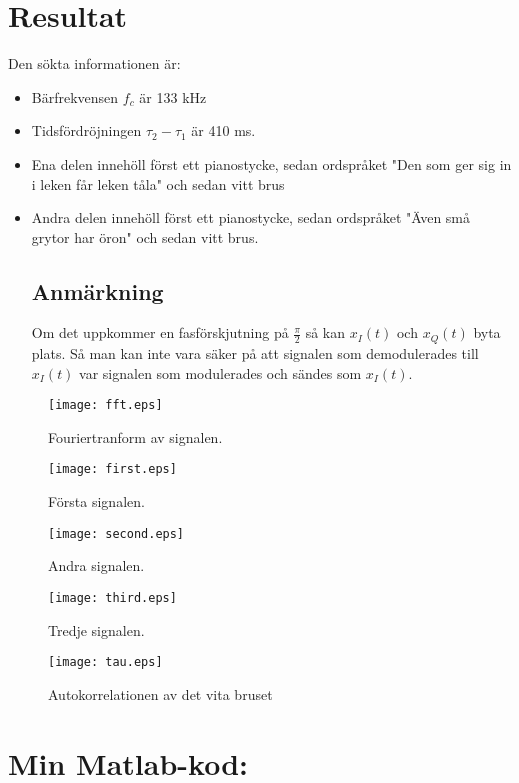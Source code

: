 \documentclass[10pt,twocolumn]{article}
\begin{document}
\section{Resultat}

Den sökta informationen är:
\begin{itemize}
\item Bärfrekvensen $f_c$ är 133 kHz
\item Tidsfördröjningen $\tau_2-\tau_1$ är 410 ms.
\item Ena delen innehöll först ett pianostycke, sedan ordspråket "Den som ger sig in i leken får leken tåla" och sedan vitt brus
\item Andra delen innehöll först ett pianostycke, sedan ordspråket "Även små grytor har öron" och sedan vitt brus.

\subsection{Anmärkning}
Om det uppkommer en fasförskjutning på $\frac{\pi}{2}$ så kan $x_I(t)$ och $x_Q(t)$ byta plats. Så man kan inte vara säker på att signalen som demodulerades till $x_I(t)$ var signalen som modulerades och sändes som $x_I(t)$.
\end{itemize}


\begin{figure}[H]
	\begin{center}
		\texttt{[image: fft.eps]}
	\end{center}
	\caption{Fouriertranform av signalen.}
	\label{fig:fft}
\end{figure}

\begin{figure}[H]
	\begin{center}
		\texttt{[image: first.eps]}
	\end{center}
	\caption{Första signalen.}
	\label{fig:first}
\end{figure}

\begin{figure}[H]
	\begin{center}
		\texttt{[image: second.eps]}
	\end{center}
	\caption{Andra signalen.}
	\label{fig:second}
\end{figure}

\begin{figure}[H]
	\begin{center}
		\texttt{[image: third.eps]}
	\end{center}
	\caption{Tredje signalen.}
	\label{fig:third}
\end{figure}

\begin{figure}[H]
	\begin{center}
		\texttt{[image: tau.eps]}
	\end{center}
	\caption{Autokorrelationen av det vita bruset}
	\label{fig:tau}
\end{figure}

\newpage
\onecolumn
\section*{Min Matlab-kod:}

\end{document}
